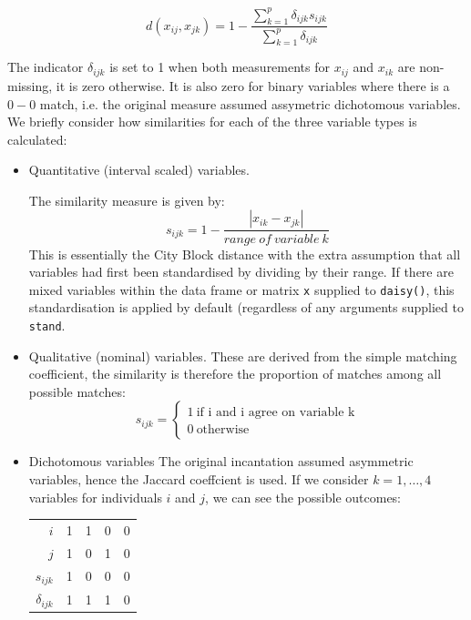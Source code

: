 \begin{equation}
d(x_{ij},x_{jk}) = 1 - \frac
{\sum_{k=1}^{p} \delta_{ijk} s_{ijk}}
{\sum_{k=1}^{p} \delta_{ijk}}
\end{equation}

The indicator  $\delta_{ijk}$ is set to 1 when both measurements for $x_{ij}$ and $x_{ik}$ are non-missing, it is zero otherwise.   It is also zero for binary variables where there is a $0-0$ match, i.e. the original measure assumed assymetric dichotomous variables.   We briefly consider how similarities for each of the three variable types is calculated:

\begin{itemize}
\item Quantitative (interval scaled) variables.

The similarity measure is given by:
\begin{equation}
\label{gowercont}
s_{ijk} = 1 - \frac{|x_{ik} - x_{jk}|}{range\ of\ variable\ k}
\end{equation}
This is essentially the City Block distance with the extra assumption that all variables had first been standardised by dividing by their range.   If there are mixed variables within the data frame or matrix \verb+x+ supplied to \verb+daisy()+, this standardisation is applied by default (regardless of any arguments supplied to \verb+stand+.

\item Qualitative (nominal) variables.
These are derived from the simple matching coefficient, the similarity is therefore the proportion of matches among all possible matches:   
\begin{displaymath}
s_{ijk} = \left\{ \begin{array}{r} 1\ \mbox{if i and i agree on variable k} \\ 0\ \mbox{otherwise} \end{array} \right.
\end{displaymath}


\item Dichotomous variables
The original incantation assumed asymmetric variables, hence the Jaccard coeffcient is used.   If we consider $k = 1, \ldots, 4$ variables for individuals $i$ and $j$, we can see the possible outcomes:
\begin{tabular}{rcccc}
$i$ & 1 & 1 & 0 & 0\\
$j$ & 1 & 0 & 1 & 0\\
\hline
$s_{ijk}$ & 1 & 0 & 0 & 0\\
$\delta_{ijk}$ & 1 & 1 & 1 & 0\\
\end{tabular}
\end{itemize}

